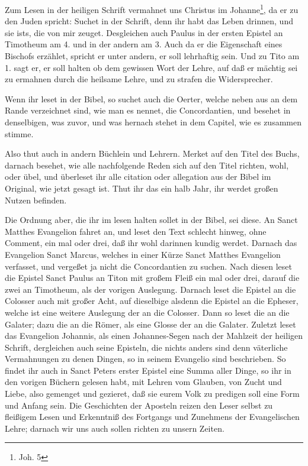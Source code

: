 Zum Lesen in der heiligen Schrift vermahnet uns Christus im Johanne\footnote{Joh. 5}, da er zu den Juden spricht: Suchet in der Schrift, denn ihr habt das Leben drinnen, und sie ists, die von mir zeuget. Desgleichen auch Paulus in der ersten Epistel an Timotheum am 4. und in der andern am 3. Auch da er die Eigenschaft eines Bischofs erzählet, spricht er unter andern, er soll lehrhaftig sein. Und zu Tito am 1. sagt er, er soll halten ob dem gewissen Wort der Lehre, auf daß er mächtig sei zu ermahnen durch die heilsame Lehre, und zu strafen die Widersprecher.

Wenn ihr leset in der Bibel, so suchet auch die Oerter, welche neben aus an dem Rande verzeichnet sind, wie man es nennet, die Concordantien, und besehet in denselbigen, was zuvor, und was hernach stehet in dem Capitel, wie es zusammen stimme.

Also thut auch in andern Büchlein und Lehrern. Merket auf den Titel des Buchs, darnach besehet, wie alle nachfolgende
Reden sich auf den Titel richten, wohl, oder übel, und überleset ihr alle citation oder allegation aus der Bibel im Original, wie jetzt gesagt ist. Thut ihr das ein halb Jahr, ihr werdet großen Nutzen befinden.

Die Ordnung aber, die ihr im lesen halten sollet in der Bibel, sei diese. An Sanct Matthes Evangelion fahret an, und leset den Text schlecht hinweg, ohne Comment, ein mal oder drei, daß ihr wohl darinnen kundig werdet. Darnach das Evangelion Sanct Marcus, welches in einer Kürze Sanct Matthes Evangelion verfasset, und vergeßet ja nicht die Concordantien zu suchen. Nach diesen leset die Epistel Sanct Paulus an Titon mit großem Fleiß ein mal oder drei, darauf die zwei an Timotheum, als der vorigen Auslegung. Darnach leset die Epistel an die Colosser auch mit großer Acht, auf dieselbige alsdenn die Epistel an die Epheser, welche ist eine weitere Auslegung der an die Colosser. Dann so leset die an die Galater; dazu die an die Römer, als eine Glosse der an die Galater. Zuletzt leset das Evangelion Johannis, als einen Johannes-Segen nach der Mahlzeit der heiligen Schrift, dergleichen auch seine Episteln, die nichts anders sind denn väterliche Vermahnungen zu denen Dingen, so in seinem Evangelio sind beschrieben. So findet ihr auch in Sanct Peters erster Epistel eine Summa aller Dinge, so ihr in den vorigen Büchern gelesen habt, mit Lehren vom Glauben, von Zucht und Liebe, also gemenget und gezieret, daß sie eurem Volk zu predigen soll eine Form und Anfang sein. Die Geschichten der Aposteln reizen den Leser selbst zu fleißigem Lesen und Erkenntniß des Fortgangs und Zunehmens der Evangelischen Lehre; darnach wir uns auch sollen richten zu unsern Zeiten.

